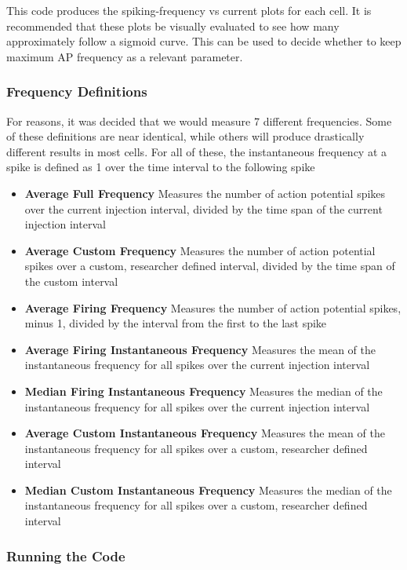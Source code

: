 \documentclass{article}
\begin{document}
This code produces the spiking-frequency vs current plots for each cell. It is recommended that these plots be visually evaluated to see how many approximately follow a sigmoid curve. This can be used to decide whether to keep maximum AP frequency as a relevant parameter.

\subsubsection{Frequency Definitions} \label{Frequency Definition}

For reasons, it was decided that we would measure 7 different frequencies. Some of these definitions are near identical, while others will produce drastically different results in most cells. For all of these, the instantaneous frequency at a spike is defined as 1 over the time interval to the following spike

\begin{itemize}
    \item \textbf{Average Full Frequency} Measures the number of action potential spikes over the current injection interval, divided by the time span of the current injection interval
    \item \textbf{Average Custom Frequency} Measures the number of action potential spikes over a custom, researcher defined interval, divided by the time span of the custom interval
    \item \textbf{Average Firing Frequency} Measures the number of action potential spikes, minus 1, divided by the interval from the first to the last spike
    \item \textbf{Average Firing Instantaneous Frequency} Measures the mean of the instantaneous frequency for all spikes over the current injection interval
    \item \textbf{Median Firing Instantaneous Frequency} Measures the median of the instantaneous frequency for all spikes over the current injection interval
    \item \textbf{Average Custom Instantaneous Frequency} Measures the mean of the instantaneous frequency for all spikes over a custom, researcher defined interval
    \item \textbf{Median Custom Instantaneous Frequency} Measures the median of the instantaneous frequency for all spikes over a custom, researcher defined interval
\end{itemize}

\subsubsection{Running the Code}
\end{document}
